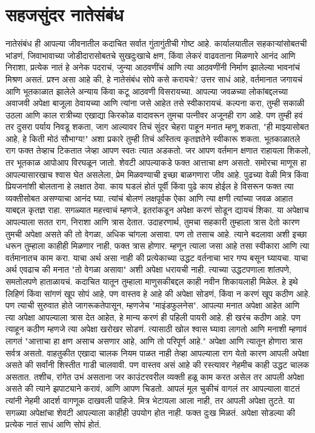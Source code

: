  \chapter{सहजसुंदर नातेसंबंध}
नातेसंबंध ही आपल्या जीवनातील कदाचित सर्वात गुंतागुंतीची गोष्ट आहे. कार्यालयातील सहकाऱ्यांसोबतची भांडणं, जिवाभावाच्या जोडीदारासोबतचे सुखदुःखाचे क्षण, किंवा लेकरं वाढवताना मिळणारे आनंद आणि निराशा,  प्रत्येक नातं हे अनेक पदराचं, जुन्या आठवणींचं आणि त्या आठवणींनी निर्माण झालेल्या भावनांचं मिश्रण असतं.
प्रश्न असा आहे की, हे नातेसंबंध सोपे कसे करायचे? उत्तर साधं आहे, वर्तमानात जगायचं आणि भूतकाळात झालेले अन्याय किंवा कटू आठवणी विसरायच्या. आपल्या जवळच्या लोकांबद्दलच्या अवाजवी अपेक्षा बाजूला ठेवायच्या आणि त्यांना जसे आहेत तसे स्वीकारायचं.
कल्पना करा, तुम्ही सकाळी उठला आणि काल रात्रीच्या एखाद्या किरकोळ वादावरून तुमचा पत्नीवर अजूनही राग आहे. पण तुम्ही हवं तर दुसरा पर्याय निवडू शकता,  जाग आल्यावर तिचं सुंदर चेहरा पाहून मनात म्हणू शकता, "ही माझ्यासोबत आहे, हे किती मोठं सौभाग्य!" अशा प्रकारे तुम्ही तिचं अस्तित्व कृतज्ञतेने स्वीकारू शकता. भूतकाळातले राग फक्त तेव्हाच टिकतात जेव्हा आपण स्वतः त्यात अडकतो. जर आपण वर्तमान क्षणात राहायला शिकलो, तर भूतकाळ आपोआप विरघळून जातो.
शेवटी आपल्याकडे फक्त आत्ताचा क्षण असतो. समोरचा माणूस हा आपल्यासारखाच श्वास घेत असलेला, प्रेम मिळवण्याची इच्छा बाळगणारा जीव आहे. पुढच्या वेळी मित्र किंवा प्रियजनांशी बोलताना हे लक्षात ठेवा. काय घडलं होतं पूर्वी किंवा पुढे काय होईल हे विसरून फक्त त्या व्यक्तीसोबत असण्याचा आनंद घ्या. त्यांचं बोलणं लक्षपूर्वक ऐका आणि त्या क्षणी त्यांच्या जवळ आहात याबद्दल कृतज्ञ राहा.
सगळ्यात महत्त्वाचं म्हणजे, इतरांकडून अपेक्षा करणं सोडून द्यायचं शिका. या अपेक्षाच आपल्याला सतत राग, निराशा आणि त्रास देतात. उदाहरणार्थ, तुमचा सहकारी तुम्हाला त्रास देतो कारण तुमची अपेक्षा असते की तो वेगळा, अधिक चांगला असावा. पण तो तसाच आहे. त्याने बदलावा अशी इच्छा धरून तुम्हाला काहीही मिळणार नाही, फक्त त्रास होणार. म्हणून त्याला जसा आहे तसा स्वीकारा आणि त्या वर्तमानातच काम करा.
याचा अर्थ असा नाही की प्रत्येकाच्या उद्धट वर्तनाचा भार गप्प बसून घ्यायचा. याचा अर्थ एवढाच की मनात "तो वेगळा असावा" अशी अपेक्षा धरायची नाही. त्याच्या उद्धटपणाला शांतपणे, समतोलपणे हाताळायचं. कदाचित यातून तुम्हाला माणुसकीबद्दल काही नवीन शिकायलाही मिळेल.
हे इथे लिहिणं किंवा सांगणं खूप सोपं आहे, पण वास्तव हे आहे की अपेक्षा सोडणं, किंवा न करणं खूप कठीण आहे. पण त्याची सुरुवात होते जागरूकतेपासून, म्हणजेच "माइंडफुलनेस". आपल्या मनात अपेक्षा आहेत आणि त्या अपेक्षा आपल्याला त्रास देत आहेत, हे मान्य करणं ही पहिली पायरी आहे. ही खरंच कठीण आहे. पण त्याहून कठीण म्हणजे त्या अपेक्षा खरोखर सोडणं. त्यासाठी खोल श्वास घ्यावा लागतो आणि मनाशी म्हणावं लागतं "आत्ताचा हा क्षण असाच असणार आहे, आणि तो परिपूर्ण आहे."
अपेक्षा आणि त्यातून होणारा त्रास सर्वत्र असतो. वाहतुकीत एखादा चालक नियम पाळत नाही तेव्हा आपल्याला राग येतो कारण आपली अपेक्षा असते की सर्वांनी शिस्तीत गाडी चालवावी. पण वास्तव असं आहे की रस्त्यावर नेहमीच काही उद्धट चालक असतात. तशीच, रांगेत उभं असताना जर काउंटरवरील व्यक्ती हळू काम करत असेल तर आपली अपेक्षा असते की त्याने झपाट्याने करावं, आणि आपण चिडतो. आपलं मूल चुकीचं वागलं तर आपल्याला वाटतं त्यांनी नेहमी आदर्श वागणूक दाखवली पाहिजे. मित्र भेटायला आला नाही, तर आपली अपेक्षा तुटते.
या सगळ्या अपेक्षांचा शेवटी आपल्याला काहीही उपयोग होत नाही. फक्त दुःख मिळतं. अपेक्षा सोडल्या की प्रत्येक नातं साधं आणि सोपं होतं.
